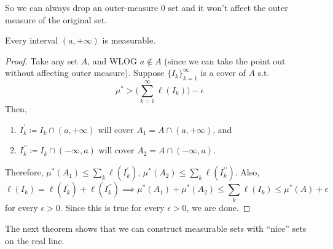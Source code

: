   So we can always drop an outer-measure $0$ set and it won't affect the outer measure of the original set. 

  \begin{theorem}
    Every interval $(a, +\infty)$ is measurable. 
  \end{theorem}
  \begin{proof}
    Take any set $A$, and WLOG $a \not\in A$ (since we can take the point out without affecting outer measure). Suppose $\{I_k\}_{k=1}^\infty$ is a cover of $A$ s.t. 
    \begin{equation}
      \mu^\ast > \bigg( \sum_{k=1}^\infty \ell (I_k) \bigg) - \epsilon 
    \end{equation}
    Then, 
    \begin{enumerate}
      \item $I_k^\prime \coloneqq I_k \cap (a, +\infty)$ will cover $A_1 = A \cap (a, +\infty)$, and 
      \item $I_k^{\prime\prime} \coloneqq I_k \cap (-\infty, a)$ will cover $A_2 = A \cap (-\infty, a)$. 
    \end{enumerate}
    Therefore, $\mu^\ast (A_1)  \leq \sum_k \ell(I_k^\prime)$, $\mu^\ast (A_2) \leq \sum_k \ell(I_k^{\prime\prime})$. Also, 
    \begin{equation}
      \ell(I_k) = \ell(I_k^\prime) + \ell(I_k^{\prime\prime}) \implies \mu^\ast (A_1) + \mu^\ast (A_2) \leq \sum_k \ell(I_k) \leq \mu^\ast (A) + \epsilon
    \end{equation}
    for every $\epsilon > 0$. Since this is true for every $\epsilon > 0$, we are done.  
  \end{proof}
  
  The next theorem shows that we can construct measurable sets with ``nice'' sets on the real line. 

